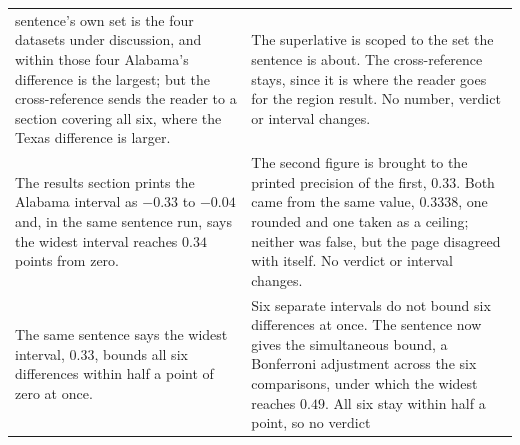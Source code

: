 \begin{table}[htb]
\begin{tabular}{@{}p{}p{}@{}}
sentence's own set is the four datasets under discussion, and
within those four Alabama's difference is the largest; but the
cross-reference sends the reader to a section covering all six,
where the Texas difference is larger. &
The superlative is scoped to the set the sentence is about. The
cross-reference stays, since it is where the reader goes for the
region result. No number, verdict or interval changes. \\
\addlinespace
The results section prints the Alabama interval as
$-0.33$ to $-0.04$ and, in the same sentence run, says the widest
interval reaches $0.34$ points from zero. &
The second figure is brought to the printed precision of the
first, $0.33$. Both came from the same value, $0.3338$, one
rounded and one taken as a ceiling; neither was false, but the
page disagreed with itself. No verdict or interval changes. \\
\addlinespace
The same sentence says the widest interval, $0.33$, bounds all
six differences within half a point of zero at once. &
Six separate intervals do not bound six differences at once.
The sentence now gives the simultaneous bound, a Bonferroni
adjustment across the six comparisons, under which the widest
reaches $0.49$. All six stay within half a point, so no verdict

\end{tabular}
\end{table}
